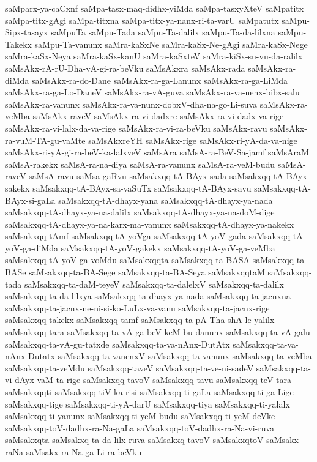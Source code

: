 {saMparx-ya-caCxnf
saMpa-tasx-maq-didhx-yiMda
saMpa-tasxyXteV
saMpatitx
saMpa-titx-gAgi
saMpa-titxna
saMpa-titx-ya-nanx-ri-ta-varU
saMpatutx
saMpu-Sipx-tasayx
saMpuTa
saMpu-Tada
saMpu-Ta-dalilx
saMpu-Ta-da-lilxna
saMpu-Takekx
saMpu-Ta-vanunx
saMra-kaSxNe
saMra-kaSx-Ne-gAgi
saMra-kaSx-Nege
saMra-kaSx-Neya
saMra-kaSx-kanU
saMra-kaSxteV
saMra-kiSx-su-vu-da-ralilx
saMsAkx-rA-rU-Dha-vA-gi-ra-beVku
saMsAkxra
saMsAkx-rada
saMsAkx-ra-diMda
saMsAkx-ra-do-Dane
saMsAkx-ra-ga-Lanunx
saMsAkx-ra-ga-LiMda
saMsAkx-ra-ga-Lo-DaneV
saMsAkx-ra-vA-guva
saMsAkx-ra-va-nenx-bibx-salu
saMsAkx-ra-vanunx
saMsAkx-ra-va-nunx-dobxV-dha-na-go-Li-suva
saMsAkx-ra-veMba
saMsAkx-raveV
saMsAkx-ra-vi-dadxre
saMsAkx-ra-vi-dadx-va-rige
saMsAkx-ra-vi-lalx-da-va-rige
saMsAkx-ra-vi-ra-beVku
saMsAkx-ravu
saMsAkx-ra-vuM-TA-gu-vaMte
saMsAkxreYH
saMsAkx-rige
saMsAkx-ri-yA-da-va-nige
saMsAkx-ri-yA-gi-ra-beV-ka-lalxveV
saMsAra
saMsA-ra-BeV-Sa-jamf
saMsAraM
saMsA-rakekx
saMsA-ra-na-diya
saMsA-ra-vanunx
saMsA-ra-veM-budu
saMsA-raveV
saMsA-ravu
saMsa-gaRvu
saMsakxqq-tA-BAyx-sada
saMsakxqq-tA-BAyx-sakekx
saMsakxqq-tA-BAyx-sa-vaSuTx
saMsakxqq-tA-BAyx-savu
saMsakxqq-tA-BAyx-si-gaLa
saMsakxqq-tA-dhayx-yana
saMsakxqq-tA-dhayx-ya-nada
saMsakxqq-tA-dhayx-ya-na-dalilx
saMsakxqq-tA-dhayx-ya-na-doM-dige
saMsakxqq-tA-dhayx-ya-na-karx-ma-vanunx
saMsakxqq-tA-dhayx-ya-nakekx
saMsakxqq-tAmf
saMsakxqq-tA-yoVga
saMsakxqq-tA-yoV-gada
saMsakxqq-tA-yoV-ga-diMda
saMsakxqq-tA-yoV-gakekx
saMsakxqq-tA-yoV-ga-veMba
saMsakxqq-tA-yoV-ga-voMdu
saMsakxqqta
saMsakxqq-ta-BASA
saMsakxqq-ta-BASe
saMsakxqq-ta-BA-Sege
saMsakxqq-ta-BA-Seya
saMsakxqqtaM
saMsakxqq-tada
saMsakxqq-ta-daM-teyeV
saMsakxqq-ta-dalelxV
saMsakxqq-ta-dalilx
saMsakxqq-ta-da-lilxya
saMsakxqq-ta-dhayx-ya-nada
saMsakxqq-ta-jacnxna
saMsakxqq-ta-jacnx-ne-ni-si-ko-LuLx-va-vanu
saMsakxqq-ta-jacnx-rige
saMsakxqq-takekx
saMsakxqq-tamf
saMsakxqq-ta-pA-Tha-shA-le-yalilx
saMsakxqq-tara
saMsakxqq-ta-vA-ga-beV-keM-bu-danunx
saMsakxqq-ta-vA-galu
saMsakxqq-ta-vA-gu-tatxde
saMsakxqq-ta-va-nAnx-DutAtx
saMsakxqq-ta-va-nAnx-Dutatx
saMsakxqq-ta-vanenxV
saMsakxqq-ta-vanunx
saMsakxqq-ta-veMba
saMsakxqq-ta-veMdu
saMsakxqq-taveV
saMsakxqq-ta-ve-ni-sadeV
saMsakxqq-ta-vi-dAyx-vaM-ta-rige
saMsakxqq-tavoV
saMsakxqq-tavu
saMsakxqq-teV-tara
saMsakxqqti
saMsakxqq-tiV-ka-risi
saMsakxqq-ti-gaLa
saMsakxqq-ti-ga-Lige
saMsakxqq-tige
saMsakxqq-ti-yA-darU
saMsakxqq-tiya
saMsakxqq-ti-yalalx
saMsakxqq-ti-yanunx
saMsakxqq-ti-yeM-budu
saMsakxqq-ti-yeM-deVke
saMsakxqq-toV-dadhx-ra-Na-gaLa
saMsakxqq-toV-dadhx-ra-Na-vi-ruva
saMsakxqta
saMsakxq-ta-da-lilx-ruva
saMsakxq-tavoV
saMsakxqtoV
saMsakx-raNa
saMsakx-ra-Na-ga-Li-ra-beVku
}
